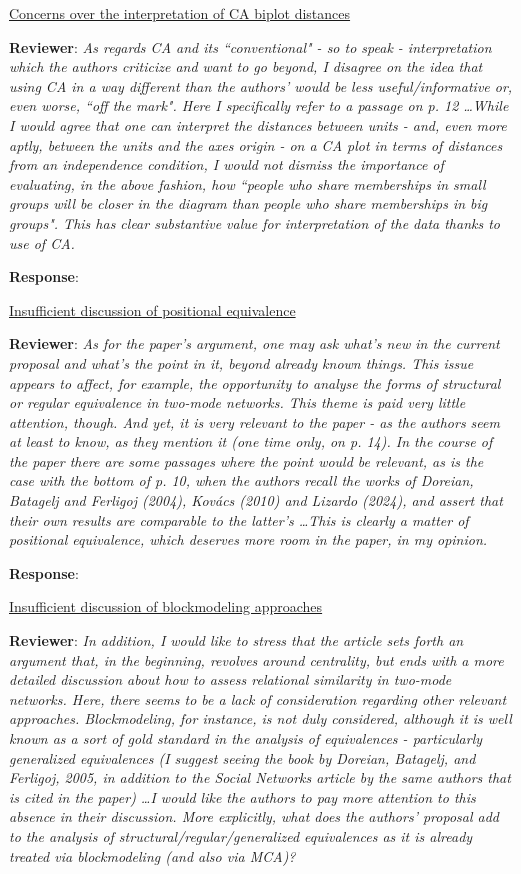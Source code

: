\documentclass{article}
\begin{document}
\underline{Concerns over the interpretation of CA biplot distances}

\textbf{Reviewer}: \textit{As regards CA and its ``conventional" - so to speak - interpretation which the authors criticize and want to go beyond, I disagree on the idea that using CA in a way different than the authors' would be less useful/informative or, even worse, ``off the mark". Here I specifically refer to a passage on p. 12 \ldots While I would agree that one can interpret the distances between units - and, even more aptly, between the units and the axes origin - on a CA plot in terms of distances from an independence condition, I would not dismiss the importance of evaluating, in the above fashion, how ``people who share memberships in small groups will be closer in the diagram than people who share memberships in big groups". This has clear substantive value for interpretation of the data thanks to use of CA.}

\textbf{Response}:

\underline{Insufficient discussion of positional equivalence}

\textbf{Reviewer}: \textit{As for the paper's argument, one may ask what's new in the current proposal and what's the point in it, beyond already known things. This issue appears to affect, for example, the opportunity to analyse the forms of structural or regular equivalence in two-mode networks. This theme is paid very little attention, though. And yet, it is very relevant to the paper - as the authors seem at least to know, as they mention it (one time only, on p. 14). In the course of the paper there are some passages where the point would be relevant, as is the case with the bottom of p. 10, when the authors recall the works of Doreian, Batagelj and Ferligoj (2004), Kovács (2010) and Lizardo (2024), and assert that their own results are comparable to the latter's \ldots This is clearly a matter of positional equivalence, which deserves more room in the paper, in my opinion.}

\textbf{Response}:

\underline{Insufficient discussion of blockmodeling approaches}

\textbf{Reviewer}: \textit{In addition, I would like to stress that the article sets forth an argument that, in the beginning, revolves around centrality, but ends with a more detailed discussion about how to assess relational similarity in two-mode networks. Here, there seems to be a lack of consideration regarding other relevant approaches. Blockmodeling, for instance, is not duly considered, although it is well known as a sort of gold standard in the analysis of equivalences - particularly generalized equivalences (I suggest seeing the book by Doreian, Batagelj, and Ferligoj, 2005, in addition to the Social Networks article by the same authors that is cited in the paper) \ldots I would like the authors to pay more attention to this absence in their discussion. More explicitly, what does the authors' proposal add to the analysis of structural/regular/generalized equivalences as it is already treated via blockmodeling (and also via MCA)?}
\end{document}
